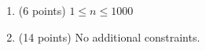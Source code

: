 \begin{enumerate}
    \tightlist
    \item (6 points) $1 \leq n \leq 1000$
    \item (14 points) No additional constraints.
\end{enumerate}
    